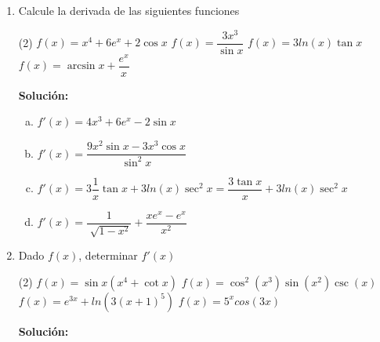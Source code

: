 \documentclass[12pt]{article}
\newenvironment{solucion}
{\begin{mdframed}[backgroundcolor=black!10]
		{\bf Solución:}\\
	}
	{
	\end{mdframed}
}
\newenvironment{preguntas}
{\begin{enumerate}\itemsep12pt
	}
	{
	\end{enumerate}
}
\begin{document}
\begin{preguntas}
\item Calcule la derivada de las siguientes funciones
\begin{tasks}(2)
\task $f(x) = x^4 + 6e^x + 2\cos x$
\task $f(x) = \dfrac{3x^3}{\sin x}$
\task $f(x) = 3ln(x)\tan x$
\task $f(x) = \arcsin x + \dfrac{e^x}{x}$
\end{tasks}
\begin{solucion}

\begin{enumerate}[a)]
\item $f'(x) = 4x^3 + 6e^x - 2\sin x$
\item $f'(x) = \dfrac{9x^2\sin x - 3x^3\cos x}{\sin^2 x}$
\item $f'(x) = 3\dfrac{1}{x}\tan x + 3ln(x) \sec^2 x = \dfrac{3 \tan x}{x} + 3ln(x) \sec^2 x$
\item $f'(x) = \dfrac{1}{\sqrt[]{1-x^2}} + \dfrac{xe^x-e^x}{x^2}$
\end{enumerate}
\end{solucion}
\item Dado $f(x)$, determinar $f'(x)$
\begin{tasks}(2)
\task $f(x) = \sin x(x^4+\cot x)$
\task $f(x) = \cos ^2 (x^3) \sin(x^2)\csc(x)$
\task $f(x) = e^{3x} + ln(3(x+1)^5)$
\task $f(x) = 5^x cos(3x)$
\end{tasks}
\begin{solucion}


\end{solucion}
\end{preguntas}
\end{document}
